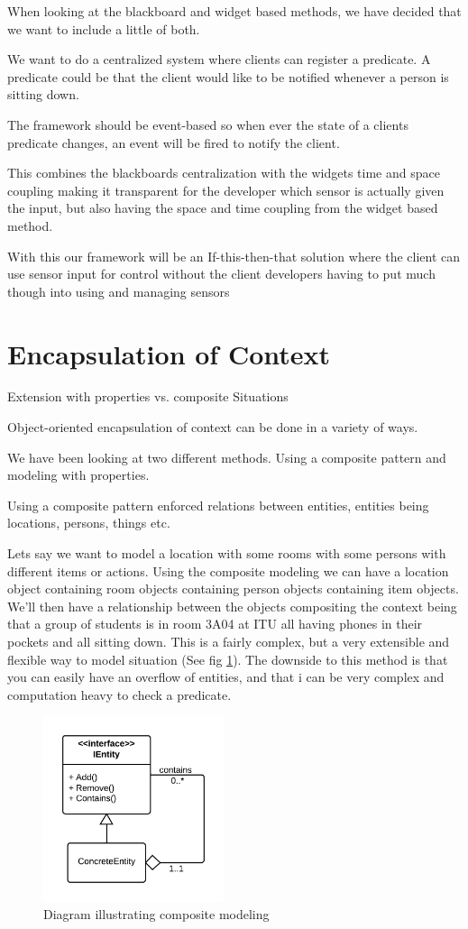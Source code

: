 \documentclass[]{report}
\begin{document}
When looking at the blackboard and widget based methods, we have decided that we want to include a little of both.

We want to do a centralized system where clients can register a predicate. A predicate could be that the client would like to be notified whenever a person is sitting down.

The framework should be event-based so when ever the state of a clients predicate changes, an event will be fired to notify the client.  

This combines the blackboards centralization with the widgets time and space coupling making it transparent for the developer which sensor is actually given the input, but also having the space and time coupling from the widget based method.

With this our framework will be an If-this-then-that solution where the client can use sensor input for control without the  client developers having to put much though into using and managing sensors   


\section{Encapsulation of Context}

Extension with properties vs. composite
Situations

Object-oriented encapsulation of context can be done in a variety of ways.

We have been looking at two different methods. Using a composite pattern and modeling with properties.

Using a composite pattern enforced relations between entities, entities being locations, persons, things etc.

Lets say we want to model a location with some rooms with some persons with different items or actions. Using the composite modeling we can have a location object containing room objects containing person objects containing item objects. We'll then have a relationship between the objects compositing the context being that a group of students is in room 3A04 at ITU all having phones in their pockets and all sitting down. This is a fairly complex, but a very extensible and flexible way to model situation (See fig \ref{fig:composite}). The downside to this method is that you can easily have an overflow of entities, and that i can be very complex and computation heavy to check a predicate.

\begin{figure}[H]
\centering
\includegraphics[width=200px]{composite.png}
\caption{Diagram illustrating composite modeling}
\label{fig:composite}
\end{figure}
\end{document}
